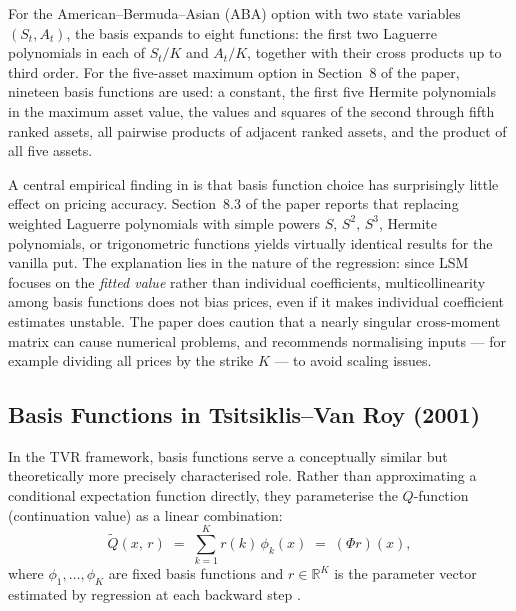 For the American--Bermuda--Asian (ABA) option with two state variables
$(S_t, A_t)$, the basis expands to eight functions: the first two Laguerre
polynomials in each of $S_t/K$ and $A_t/K$, together with their cross
products up to third order. For the five-asset maximum option in Section~8
of the paper, nineteen basis functions are used: a constant, the first five
Hermite polynomials in the maximum asset value, the values and squares of
the second through fifth ranked assets, all pairwise products of adjacent
ranked assets, and the product of all five assets.

A central empirical finding in \citet{longstaff2001} is that basis function
choice has surprisingly little effect on pricing accuracy. Section~8.3 of
the paper reports that replacing weighted Laguerre polynomials with simple
powers $S,\, S^2,\, S^3$, Hermite polynomials, or trigonometric functions
yields virtually identical results for the vanilla put. The explanation lies
in the nature of the regression: since LSM focuses on the \emph{fitted
value} rather than individual coefficients, multicollinearity among basis
functions does not bias prices, even if it makes individual coefficient
estimates unstable. The paper does caution that a nearly singular
cross-moment matrix can cause numerical problems, and recommends normalising
inputs --- for example dividing all prices by the strike $K$ --- to avoid
scaling issues.

\subsection{Basis Functions in Tsitsiklis--Van Roy (2001)}

In the TVR framework, basis functions serve a conceptually similar but
theoretically more precisely characterised role. Rather than approximating a
conditional expectation function directly, they parameterise the
$Q$-function (continuation value) as a linear combination:
\begin{equation}
    \tilde{Q}(x,\, r) \;=\; \sum_{k=1}^{K} r(k)\,\phi_k(x)
    \;=\; (\Phi r)(x),
    \label{eq:TVR_parameterisation}
\end{equation}
where $\phi_1, \ldots, \phi_K$ are fixed basis functions and $r \in
\mathbb{R}^K$ is the parameter vector estimated by regression at each
backward step \citep{tsitsiklis2001}.

